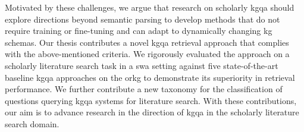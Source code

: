 Motivated by these challenges, we argue that research on scholarly \gls{kgqa} should explore directions beyond semantic parsing to develop methods that do not require training or fine-tuning and can adapt to dynamically changing \gls{kg} schemas. Our thesis contributes a novel \gls{kgqa} retrieval approach that complies with the above-mentioned criteria. We rigorously evaluated the approach on a scholarly literature search task in a \gls{swa} setting against five state-of-the-art baseline \gls{kgqa} approaches on the \gls{orkg} to demonstrate its superiority in retrieval performance. We further contribute a new taxonomy for the classification of questions querying \gls{kgqa} systems for literature search. With these contributions, our aim is to advance research in the direction of \gls{kgqa} in the scholarly literature search domain.










